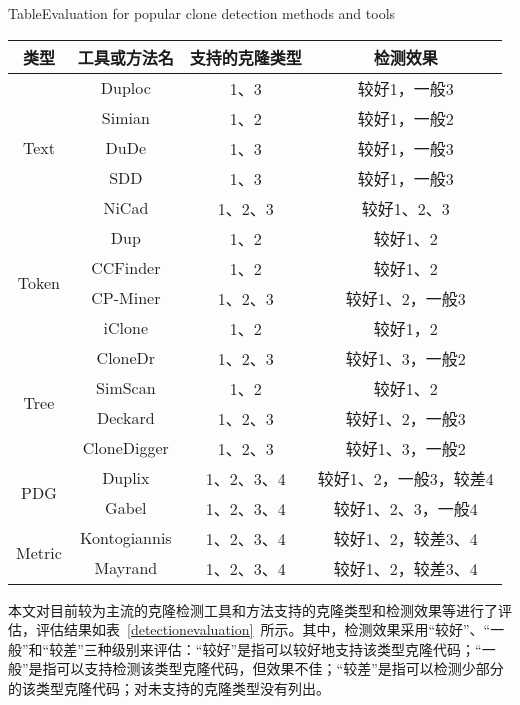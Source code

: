 \begin{table}[h]
{Table$\!$}{Evaluation for popular clone detection methods and tools}
\vspace{0.5em}
\centering
\wuhao
\begin{tabular}{cccc}
\toprule[1.5pt]
类型&工具或方法名&支持的克隆类型&检测效果\\
\midrule[1pt]
\multirow{5}{*}{Text} 
& Duploc\cite{ducasse1999language}&1、3&较好1，一般3\\
&Simian&1、2	&较好1，一般2\\
&DuDe\cite{wettel2005archeology}&1、3	&较好1，一般3\\
&SDD\cite{lee2005sdd}&1、3	&较好1，一般3\\
&NiCad\cite{roy2008nicad}&	1、2、3	&较好1、2、3\\
\hline
\multirow{4}{*}{Token} 
&Dup\cite{baker1995finding}&	1、2&较好1、2\\
&CCFinder\cite{kamiya2002ccfinder}&1、2&较好1、2\\
&CP-Miner\cite{li2006cp}&1、2、3&较好1、2，一般3\\
&iClone\cite{gode2009incremental}&1、2	&较好1，2\\
\hline
\multirow{4}{*}{Tree} 
&CloneDr\cite{baxter1998clone}&	1、2、3	&较好1、3，一般2\\
&SimScan&	1、2	&较好1、2\\
&Deckard\cite{jiang2007deckard}&	1、2、3	&较好1、2，一般3\\
&CloneDigger\cite{bulychev2008duplicate}&	1、2、3	&较好1、3，一般2\\
\hline
\multirow{2}{*}{PDG} 
&Duplix\cite{krinke2001identifying}&	1、2、3、4	&较好1、2，一般3，较差4\\
&Gabel\cite{gabel2008scalable}&1、2、3、4	&较好1、2、3，一般4\\
\hline
\multirow{2}{*}{Metric} 
&Kontogiannis\cite{kontogiannis1996pattern}&	1、2、3、4	&较好1、2，较差3、4\\
&Mayrand\cite{mayrand1996experiment}&	1、2、3、4	&较好1、2，较差3、4\\
\bottomrule[1.5pt]
\end{tabular}
\end{table}

本文对目前较为主流的克隆检测工具和方法支持的克隆类型和检测效果等进行了评估，评估结果如表~\ref{detectionevaluation}~所示。其中，检测效果采用“较好”、“一般”和“较差”三种级别来评估\cite{rattan2013software}：“较好”是指可以较好地支持该类型克隆代码；“一般”是指可以支持检测该类型克隆代码，但效果不佳；“较差”是指可以检测少部分的该类型克隆代码；对未支持的克隆类型没有列出。

